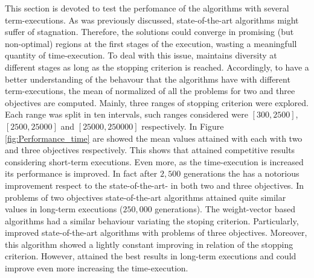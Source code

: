 This section is devoted to test the perfomance of the algorithms with several term-executions.
%
As was previously discussed, state-of-the-art algorithms might suffer of stagnation.
%
Therefore, the solutions could converge in promising (but non-optimal) regions at the first stages of the execution, wasting a meaningfull quantity of time-execution.
%
To deal with this issue, \VSDMOEA{} maintains diversity at different stages as long as the stopping criterion is reached.
%
Accordingly, to have a better understanding of the behavour that the algorithms have with different term-executions, the mean of normalized \HV{} of all the problems for two and three objectives are computed.
%
Mainly, three ranges of stopping criterion were explored.
%
Each range was split in ten intervals, such ranges considered were $[300, 2500]$, $[2500, 25000]$ and $[25000, 250000]$ respectively.
%
In Figure \ref{fig:Performance_time} are showed the mean \HV{} values attained with each \MOEA{} with two and three objectives respectively.
%
This shows that \VSDMOEA{} attained competitive results considering short-term executions.
%
Even more, as the time-execution is increased its performance is improved.
%
In fact after $2,500$ generations the \VSDMOEA{} has a notorious improvement respect to the state-of-the-art-\MOEAS{} in both two and three objectives.
%
In problems of two objectives state-of-the-art algorithms attained quite similar \HV{} values in long-term executions ($250,000$ generations).
%
The weight-vector based algorithms had a similar behaviour variating the stoping criterion.
%
Particularly, \RMOEA{} improved state-of-the-art algorithms with problems of three objectives.
%
Moreover, this algorithm showed a lightly constant improving in relation of the stopping criterion.
%
However, \VSDMOEA{} attained the best results in long-term executions and could improve even more increasing the time-execution.
%


%
%
%
%
%
%
%
%
%
%
%
%
%
%
%


